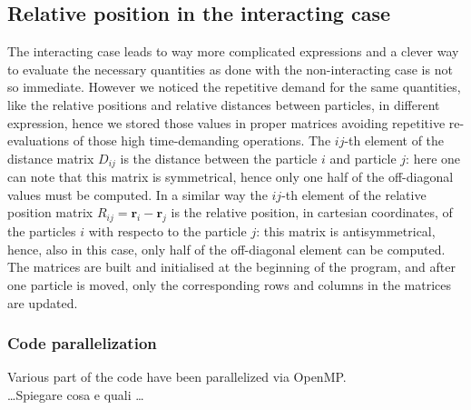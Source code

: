 \subsection*{Relative position in the interacting case}
The interacting case leads to way more complicated expressions and a clever way to evaluate the necessary quantities as done with the non-interacting case is not so immediate. However we noticed the repetitive demand for the same quantities, like the relative positions and relative distances between particles, in different expression, hence we stored those values in proper matrices avoiding repetitive re-evaluations of those high time-demanding operations. The $ij$-th element of the distance matrix $D_{ij}$ is the distance between the particle $i$ and particle $j$: here one can note that this matrix is symmetrical, hence only one half of the off-diagonal values must be computed. In a similar way the $ij$-th element of the relative position matrix $R_{ij} = \bm{r}_i - \bm{r}_j$ is the relative position, in cartesian coordinates, of the particles $i$ with respecto to the particle $j$: this matrix is antisymmetrical, hence, also in this case, only half of the off-diagonal element can be computed. The matrices are built and initialised at the beginning of the program, and after one particle is moved, only the corresponding rows and columns in the matrices are updated.
\subsubsection*{Code parallelization}
Various part of the code have been parallelized via OpenMP. \\
\dots Spiegare cosa e quali \dots 